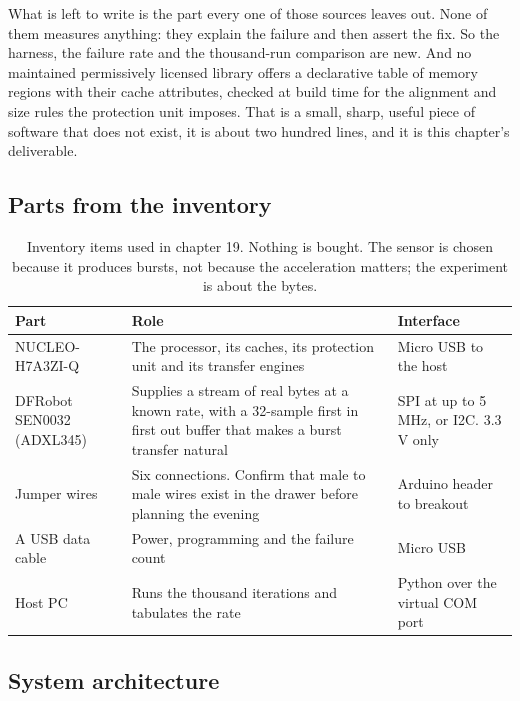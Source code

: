 What is left to write is the part every one of those sources leaves out. None
of them measures anything: they explain the failure and then assert the fix. So
the harness, the failure rate and the thousand-run comparison are new. And no
maintained permissively licensed library offers a declarative table of memory
regions with their cache attributes, checked at build time for the alignment
and size rules the protection unit imposes. That is a small, sharp, useful
piece of software that does not exist, it is about two hundred lines, and it is
this chapter's deliverable.

\subsection*{Parts from the inventory}

\begin{table}[H]\centering\small
\begin{tabular}{p{40mm}p{66mm}p{40mm}}
\toprule
Part & Role & Interface \\
\midrule
NUCLEO-H7A3ZI-Q & The processor, its caches, its protection unit and its transfer engines & Micro USB to the host \\
DFRobot SEN0032 (ADXL345) & Supplies a stream of real bytes at a known rate, with a 32-sample first in first out buffer that makes a burst transfer natural & SPI at up to 5 MHz, or I2C. 3.3 V only \\
Jumper wires & Six connections. Confirm that male to male wires exist in the drawer before planning the evening & Arduino header to breakout \\
A USB data cable & Power, programming and the failure count & Micro USB \\
Host PC & Runs the thousand iterations and tabulates the rate & Python over the virtual COM port \\
\bottomrule
\end{tabular}
\caption{Inventory items used in chapter 19. Nothing is bought. The sensor is chosen because it produces bursts, not because the acceleration matters; the experiment is about the bytes.}
\end{table}

\subsection*{System architecture}


